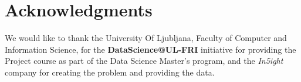 \documentclass[fleqn,moreauthors,10pt]{ds_report}
\begin{document}
\section*{Acknowledgments}

We would like to thank the University Of Ljubljana, Faculty of Computer and Information Science, for the \textbf{DataScience@UL-FRI} initiative for providing the Project course as part of the Data Science Master's program, and the \textit{In5ight} company for creating the problem and providing the data.




\end{document}
